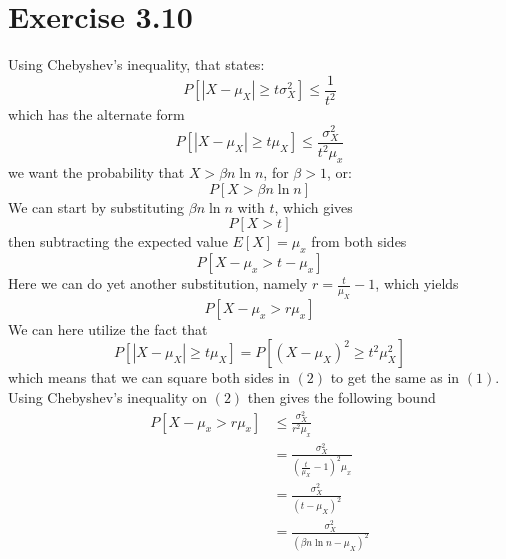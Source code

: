 \documentclass[a4paper]{article}
\begin{document}
\section*{Exercise 3.10}
Using Chebyshev's inequality, that states:
$$
  P[|X-\mu_X|\geq t\sigma^2_X ]\leq \frac{1}{t^2}
$$
which has the alternate form
\begin{equation}
  P[|X-\mu_X|\geq t\mu_X ]\leq \frac{\sigma^2_X}{t^2\mu_x}
\end{equation}
we want the probability that $X>\beta n \ln n$, for $\beta > 1$, or:
$$
  P[X > \beta n \ln n]
$$
We can start by substituting $\beta n \ln n$ with $t$, which gives
$$
  P[X > t]
$$
then subtracting the expected value $E[X]=\mu_x$ from both sides
$$
  P[X - \mu_x > t - \mu_x]
$$
Here we can do yet another substitution, namely $r=\frac{t}{\mu_X} -1$, which yields
\begin{equation}
  P[X - \mu_x > r\mu_x]
\end{equation}
We can here utilize the fact that
$$
  P[|X-\mu_X|\geq t\mu_X ] = P[(X-\mu_X)^2\geq t^2\mu_X^2 ]
$$
which means that we can square both sides in $(2)$ to get the same as in $(1)$. Using Chebyshev's inequality on $(2)$ then gives the following bound
\begin{align*}
  P[X - \mu_x > r\mu_x] &\leq \frac{\sigma^2_X}{r^2\mu_x} \\
                        &=\frac{\sigma^2_X}{\left(\frac{t}{\mu_X} - 1\right)^2\mu_x}\\
                        &=\frac{\sigma^2_X}{(t-\mu_X)^2}\\
                        &=\frac{\sigma^2_X}{(\beta n \ln n-\mu_X)^2}
\end{align*}
\end{document}
